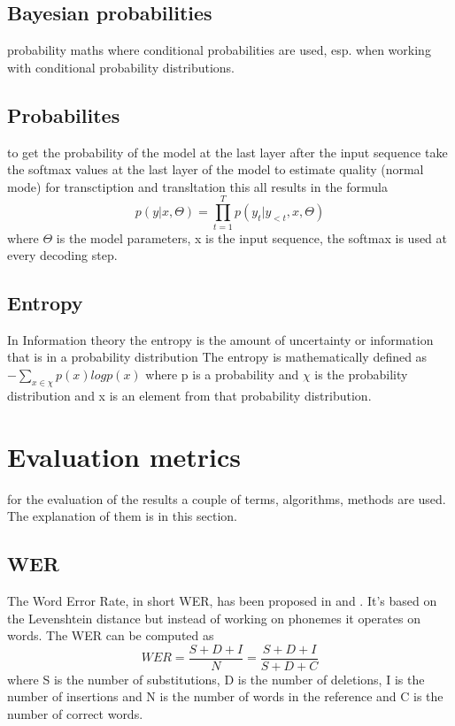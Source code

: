 \subsection{Bayesian probabilities}
probability maths where conditional probabilities are used, esp. when working with conditional probability distributions.

\subsection{Probabilites}
to get the probability of the model at the last layer after the input sequence  
take the softmax values at the last layer of the model to estimate quality (normal mode) for transctiption and transltation 
this all results in the formula $$p(y|x,\Theta)=\prod_{t=1}^T p(y_t|y_{<t}, x, \Theta) $$ where $\Theta$ is the model parameters, x is the input sequence, the softmax is used at every decoding step.

\subsection{Entropy}
\label{entropy}
In Information theory the entropy is the amount of uncertainty or information that is in a probability distribution
The entropy is mathematically defined as $- \sum_{x\in \chi} p(x) log p(x)$ where p is a probability and $\chi$ is the probability distribution and x is an element from that probability distribution.

\section{Evaluation metrics}
 for the evaluation of the results a couple of terms, algorithms, methods are used. The explanation of them is in this section. 
 
\subsection{WER}
\label{wer}
The Word Error Rate, in short WER, has been proposed in \cite{woodard1982} and \cite{morris2004}.
It's based on the Levenshtein distance but instead of working on phonemes it operates on words.
The WER can be computed as $$WER=\frac{S+D+I}{N}=\frac{S+D+I}{S+D+C}$$ where S is the number of substitutions, D is the number of deletions, I is the number of insertions and N is the number of words in the reference and C is the number of correct words.

